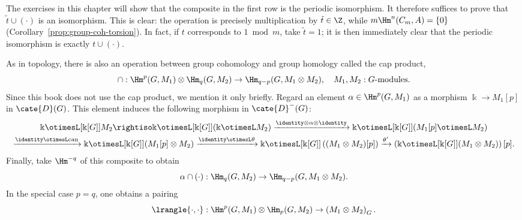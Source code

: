 \begin{example}
	The exercises in this chapter will show that the composite in the first
	row is the periodic isomorphism. It therefore suffices to prove that
	$\tilde{t}\cup(\cdot)$ is an isomorphism. This is clear: the operation is
	precisely multiplication by $\tilde{t}\in\Z$, while
	$m\Hm^n(C_m,A)=\{0\}$
	(Corollary~\ref{prop:group-coh-torsion}). In fact, if $t$ corresponds to
	$1\bmod m$, take $\tilde{t}=1$; it is then immediately clear that the
	periodic isomorphism is exactly $t\cup(\cdot)$.
\end{example}

\begin{remark}\label{rem:cap-product}
	As in topology, there is also an operation between group cohomology and
	group homology called the cap product,
	\[ \cap: \Hm^p(G, M_1) \otimes \Hm_q(G, M_2) \to \Hm_{q-p}(G, M_1 \otimes M_2), \quad M_1, M_2: \text{$G$-modules}. \]
	Since this book does not use the cap product, we mention it only briefly.
	Regard an element $\alpha\in\Hm^p(G,M_1)$ as a morphism
	$\Bbbk\to M_1[p]$ in $\cate{D}(G)$. This element induces the following
	morphism in $\cate{D}^-(G)$:
	\begin{multline*}
		\Bbbk \otimesL[{\Bbbk[G]}] M_2 \rightiso \Bbbk \otimesL[{\Bbbk[G]}] (\Bbbk \otimesL M_2) \xrightarrow{\identity \otimes \alpha \otimes \identity} \Bbbk \otimesL[{\Bbbk[G]}] (M_1[p] \otimesL M_2) \\
		\xrightarrow{\identity \otimesL \mathrm{can}} \Bbbk \otimesL[{\Bbbk[G]}] (M_1[p] \otimes M_2) \xrightarrow{\identity \otimesL \theta} \Bbbk \otimesL[{\Bbbk[G]}] \left( (M_1 \otimes M_2)[p] \right) \xrightarrow{\theta'} \left(\Bbbk \otimesL[{\Bbbk[G]}] (M_1 \otimes M_2)\right) [p].
	\end{multline*}
	Finally, take $\Hm^{-q}$ of this composite to obtain
	\[ \alpha \cap (\cdot): \Hm_q(G, M_2) \to \Hm_{q-p}(G, M_1 \otimes M_2). \]
	In the special case $p=q$, one obtains a pairing
	\[ \lrangle{\cdot, \cdot}: \Hm^p(G, M_1) \otimes \Hm_p(G, M_2) \to \left( M_1 \otimes M_2 \right)_G . \]
\end{remark}
